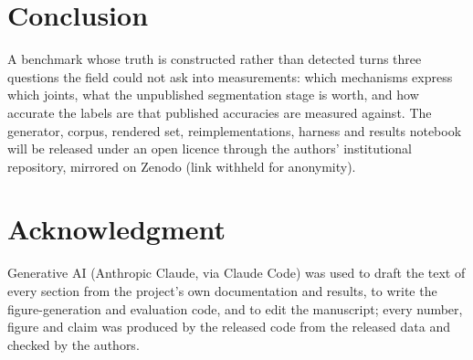 \documentclass[letterpaper, 10 pt, conference]{ieeeconf}
\begin{document}
\section{Conclusion}
A benchmark whose truth is constructed rather than detected turns three questions the field could not ask into measurements: which mechanisms express which joints, what the unpublished segmentation stage is worth, and how accurate the labels are that published accuracies are measured against. The generator, corpus, rendered set, reimplementations, harness and results notebook will be released under an open licence through the authors' institutional repository, mirrored on Zenodo (link withheld for anonymity).

\section*{Acknowledgment}
Generative AI (Anthropic Claude, via Claude Code) was used to draft the text of every section from the project's own documentation and results, to write the figure-generation and evaluation code, and to edit the manuscript; every number, figure and claim was produced by the released code from the released data and checked by the authors.



\end{document}
